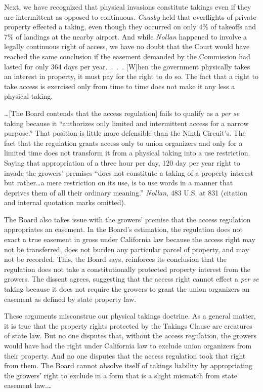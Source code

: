 Next, we have recognized that physical invasions constitute takings even if they
are intermittent as opposed to continuous. \textit{Causby} held that overflights
of private property effected a taking, even though they occurred on only 4\% of
takeoffs and 7\% of landings at the nearby airport. And while \textit{Nollan}
happened to involve a legally continuous right of access, we have no doubt that
the Court would have reached the same conclusion if the easement demanded by the
Commission had lasted for only 364 days per year.~.~.~. [W]hen the government
physically takes an interest in property, it must pay for the right to do so.
The fact that a right to take access is exercised only from time to time does
not make it any less a physical taking.


\ldots [The Board contends that the access regulation] fails to qualify as a
\textit{per se} taking because it ``authorizes only limited and intermittent
access for a narrow purpose.'' That position is little more defensible than the
Ninth Circuit's. The fact that the regulation grants access only to union
organizers and only for a limited time does not transform it from a physical
taking into a use restriction. Saying that appropriation of a three hour per
day, 120 day per year right to invade the growers' premises ``does not
constitute a taking of a property interest but rather\ldots a mere restriction
on its use, is to use words in a manner that deprives them of all their ordinary
meaning.'' \textit{Nollan}, 483 U.S. at 831 (citation and internal quotation
marks omitted).


The Board also takes issue with the growers' premise that the access regulation
appropriates an easement. In the Board's estimation, the regulation does not
exact a true easement in gross under California law because the access right may
not be transferred, does not burden any particular parcel of property, and may
not be recorded. This, the Board says, reinforces its conclusion that the
regulation does not take a constitutionally protected property interest from the
growers. The dissent agrees, suggesting that the access right cannot effect a
\textit{per se} taking because it does not require the growers to grant the
union organizers an easement as defined by state property law. 


These arguments misconstrue our physical takings doctrine. As a general matter,
it is true that the property rights protected by the Takings Clause are
creatures of state law. But no one disputes that, without the access regulation,
the growers would have had the right under California law to exclude union
organizers from their property. And no one disputes that the access regulation
took that right from them. The Board cannot absolve itself of takings liability
by appropriating the growers' right to exclude in a form that is a slight
mismatch from state easement law.\ldots


